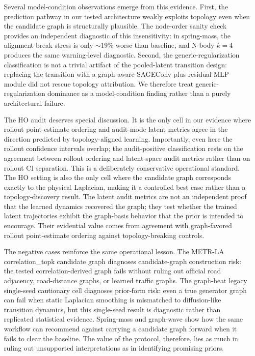 \documentclass[preprint,12pt]{elsarticle}
\begin{document}
Several model-condition observations emerge from this evidence. 
First, the prediction pathway in our tested architecture weakly 
exploits topology even when the candidate graph is structurally 
plausible. The node-order sanity check provides an independent 
diagnostic of this insensitivity: in spring-mass, the alignment-break 
stress is only \(\sim 19\%\) worse than baseline, and N-body \(k=4\) 
produces the same warning-level diagnostic. Second, the 
generic-regularization classification is not a trivial artifact of 
the pooled-latent transition design: replacing the transition with a 
graph-aware SAGEConv-plus-residual-MLP module did not rescue topology 
attribution. We therefore treat generic-regularization dominance as 
a model-condition finding rather than a purely architectural failure.

The HO audit deserves special discussion. It is the only cell in 
our evidence where rollout point-estimate ordering and audit-mode 
latent metrics agree in the direction predicted by topology-aligned 
learning. Importantly, even here the rollout confidence intervals 
overlap; the audit-positive classification rests on the agreement 
between rollout ordering and latent-space audit metrics rather than 
on rollout CI separation. This is a deliberately conservative 
operational standard. The HO setting is also the only cell where 
the candidate graph corresponds exactly to the physical Laplacian, 
making it a controlled best case rather than a topology-discovery 
result. The latent audit metrics are not an independent proof that the 
learned dynamics recovered the graph; they test whether the trained 
latent trajectories exhibit the graph-basis behavior that the prior is 
intended to encourage. Their evidential value comes from agreement 
with graph-favored rollout point-estimate ordering against 
topology-breaking controls.

The negative cases reinforce the same operational lesson. The 
METR-LA correlation\_topk candidate graph diagnoses 
candidate-graph construction risk: the tested correlation-derived 
graph fails without ruling out official road adjacency, road-distance 
graphs, or learned traffic graphs. The graph-heat legacy single-seed 
cautionary cell diagnoses prior-form risk: even a true generator graph 
can fail when static Laplacian smoothing is mismatched to 
diffusion-like transition dynamics, but this single-seed result is 
diagnostic rather than replicated statistical evidence. Spring-mass and graph-wave show how the same 
workflow can recommend against carrying a candidate graph forward 
when it fails to clear the baseline. The value of the protocol, 
therefore, lies as much in ruling out unsupported interpretations as 
in identifying promising priors.
\end{document}
